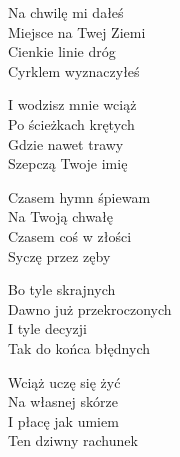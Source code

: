 \begin{text}
    Na chwilę mi dałeś\\
    Miejsce na Twej Ziemi\\
    Cienkie linie dróg\\
    Cyrklem wyznaczyłeś

    I wodzisz mnie wciąż\\
    Po ścieżkach krętych\\
    Gdzie nawet trawy\\
    Szepczą Twoje imię

    Czasem hymn śpiewam\\
    Na Twoją chwałę\\
    Czasem coś w złości\\
    Syczę przez zęby

    Bo tyle skrajnych\\
    Dawno już przekroczonych\\
    I tyle decyzji\\
    Tak do końca błędnych

    Wciąż uczę się żyć\\
    Na własnej skórze\\
    I płacę jak umiem\\
    Ten dziwny rachunek
\end{text}
\begin{chord}

\end{chord}